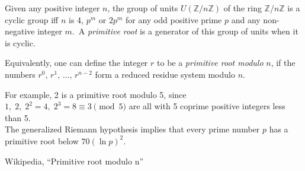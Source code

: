 \documentclass[12pt]{article}
\begin{document}
Given any positive integer $n$, the group of units $U(\mathbb{Z}/n\mathbb{Z})$ of the ring $\mathbb{Z}/n\mathbb{Z}$ is a cyclic group iff $n$ is 4, $p^m$ or $2p^m$ for any odd positive prime $p$ and any non-negative integer $m$.\, A \emph{primitive root} is a generator of this group of units when it is cyclic.

Equivalently, one can define the integer $r$ to be a {\em primitive root modulo} $n$, if the numbers $r^0,\,r^1,\,\ldots,\,r^{n-2}$ form a reduced residue system modulo $n$.

For example, 2 is a primitive root modulo 5, since
$1,\; 2,\; 2^2 = 4,\; 2^3 = 8 \equiv 3 \pmod{5}$
are all with 5 coprime positive integers less than 5.\\

The generalized Riemann hypothesis implies that every prime number $p$ has a primitive root below $70(\ln p)^2$.

\begin{thebibliography}{8}
Wikipedia, ``Primitive root modulo n''
\end{thebibliography}
\end{document}
